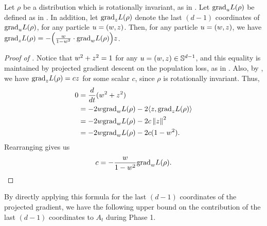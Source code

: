 \begin{lemma}\label{lemma:at_1}
Let $\rho$ be a distribution which is rotationally invariant, as in . Let ${\textup{grad}}_u L(\rho)$ be defined as in . In addition, let ${\textup{grad}}_z L(\rho)$ denote the last $(d - 1)$ coordinates of ${\textup{grad}}_u L(\rho)$, for any particle $u = (w, z)$. Then, for any particle $u = (w, z)$, we have ${\textup{grad}}_z L(\rho) = -\Big(\frac{w}{1-w^2}\cdot {\textup{grad}}_w L(\rho) \Big)z$.
\end{lemma}
\begin{proof}[Proof of ]
    Notice that $w^2 + z^2=1$ for any $u = (w, z) \in \mathbb{S}^{d - 1}$, and this equality is maintained by projected gradient descent on the population loss, as in . Also, by , we have ${\textup{grad}}_z L(\rho) = cz$ for some scalar $c$, since $\rho$ is rotationally invariant. Thus,
    \begin{align}
        0 &= \frac{d}{dt} (w^2 + z^2)\\
        &= -2w {\textup{grad}}_w L(\rho) -2 \langle z , {\textup{grad}}_z L(\rho) \rangle\\
        &= -2w {\textup{grad}}_w L(\rho) -2c\left\lVert z\right\rVert^2\\
        &= -2w {\textup{grad}}_w L(\rho) -2c(1-w^2).
    \end{align}
Rearranging gives us
\begin{align}
    c = -\frac{w}{1-w^2} {\textup{grad}}_w L(\rho).
\end{align}
\end{proof}

By directly applying this formula for the last $(d - 1)$ coordinates of the projected gradient, we have the following upper bound on the contribution of the last $(d - 1)$ coordinates to $A_t$ during Phase 1.

